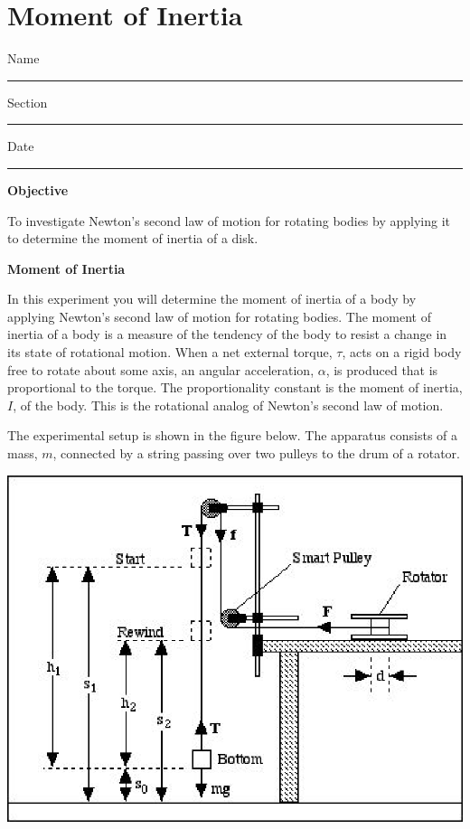 
\section{Moment of Inertia}

Name \rule{2.0in}{0.1pt}\hfill{}Section \rule{1.0in}{0.1pt}\hfill{}Date \rule{1.0in}{0.1pt}

\textbf{Objective} 

To investigate Newton's second law of motion for rotating bodies by applying
it to determine the moment of inertia of a disk.

\textbf{Moment of Inertia} 

In this experiment you will determine the moment of inertia of a body by applying
Newton's second law of motion for rotating bodies. The moment of inertia of
a body is a measure of the tendency of the body to resist a change in its state
of rotational motion. When a net external torque, 
$\tau$, acts on a rigid body free
to rotate about some axis, an angular acceleration, 
$\alpha$, is produced that is
proportional to the torque. The proportionality constant is the moment of inertia,
$I$, of the body. This is the rotational analog of Newton's second law of motion. 

The experimental setup is shown in the figure below. The apparatus consists
of a mass, $m$, connected by a string passing over two pulleys to the drum of
a rotator.

\vspace{0.3cm}
{\par\centering \includegraphics{moment_inertia_fig1.eps} \par}
\vspace{0.3cm}

